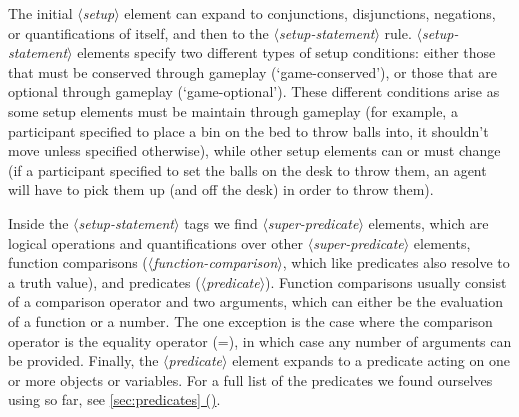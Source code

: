 \documentclass{article}
\newcommand{\dsl}[1]{{\it $\langle$#1$\rangle$}}
\newcommand*{\fullref}[1]{\hyperref[{#1}]{\autoref*{#1} (\nameref*{#1})}} %
\begin{document}
The initial \dsl{setup} element can expand to conjunctions, disjunctions, negations, or quantifications of itself, and then to the \dsl{setup-statement} rule.
\dsl{setup-statement} elements specify two different types of setup conditions: either those that must be conserved through gameplay (`game-conserved'), or those that are optional through gameplay (`game-optional').
These different conditions arise as some setup elements must be maintain through gameplay (for example, a participant specified to place a bin on the bed to throw balls into, it shouldn't move unless specified otherwise), while other setup elements can or must change (if a participant specified to set the balls on the desk to throw them, an agent will have to pick them up (and off the desk) in order to throw them).

Inside the \dsl{setup-statement} tags we find \dsl{super-predicate} elements, which are logical operations and quantifications over other \dsl{super-predicate} elements,  function comparisons (\dsl{function-comparison}, which like predicates also resolve to a truth value), and predicates (\dsl{predicate}).
Function comparisons usually consist of a comparison operator and two arguments, which can either be the evaluation of a function or a number.
The one exception is the case where the comparison operator is the equality operator (=), in which case any number of arguments can be provided.
Finally, the \dsl{predicate} element expands to a predicate acting on one or more objects or variables.
For a full list of the predicates we found ourselves using so far, see \fullref{sec:predicates}.
\end{document}
